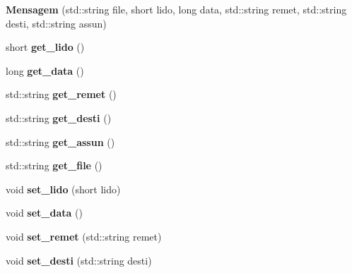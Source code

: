 \begin{DoxyCompactItemize}
\item 
\mbox{\label{class_mensagem_a64e72942121efdfb84bc4e16e5a6fbba}} 
{\bfseries Mensagem} (std\+::string file, short lido, long data, std\+::string remet, std\+::string desti, std\+::string assun)
\item 
\mbox{\label{class_mensagem_a202bd7afe5cedddd359e14c0b0c27b2a}} 
short {\bfseries get\+\_\+lido} ()
\item 
\mbox{\label{class_mensagem_a5a72e2787d18c5b0c7d280eb2ab330a7}} 
long {\bfseries get\+\_\+data} ()
\item 
\mbox{\label{class_mensagem_ad92d51e96ff8e6b2293bd38bf17969e5}} 
std\+::string {\bfseries get\+\_\+remet} ()
\item 
\mbox{\label{class_mensagem_a0bc39a57ad80a30ec7ab676aaff2f7d7}} 
std\+::string {\bfseries get\+\_\+desti} ()
\item 
\mbox{\label{class_mensagem_ad7842a1b5808706231a472750c6c50e7}} 
std\+::string {\bfseries get\+\_\+assun} ()
\item 
\mbox{\label{class_mensagem_af1ed04b13a3dcac00254ffe6ddc0d65a}} 
std\+::string {\bfseries get\+\_\+file} ()
\item 
\mbox{\label{class_mensagem_a65101216467b7782b93dabb3074b1eb0}} 
void {\bfseries set\+\_\+lido} (short lido)
\item 
\mbox{\label{class_mensagem_a88f1fb07b42306f0a29898016246917e}} 
void {\bfseries set\+\_\+data} ()
\item 
\mbox{\label{class_mensagem_a9ebcf53c3d972608180487245dca7218}} 
void {\bfseries set\+\_\+remet} (std\+::string remet)
\item 
\mbox{\label{class_mensagem_a3a46b42de52a255cd0586bbbb2be622a}} 
void {\bfseries set\+\_\+desti} (std\+::string desti)
\item 
\mbox{\label{class_mensagem_a5378614d149a5b2047924086a8c6c53d}} 

\end{DoxyCompactItemize}
